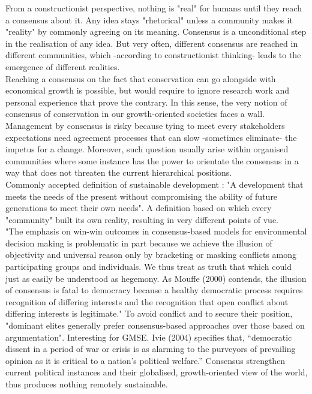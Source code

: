 \documentclass[12pt]{article}
\begin{document}
From a constructionist perspective, nothing is "real" for humans until they reach a consensus about it.
Any idea stays "rhetorical" unless a community makes it "reality" by commonly agreeing on its meaning.
Consensus is a unconditional step in the realisation of any idea.
But very often, different consensus are reached in different communities, which -according to constructionist thinking- leads to the emergence of different realities.\\
Reaching a consensus on the fact that conservation can go alongside with economical growth is possible, but would require to ignore research work and personal experience that prove the contrary. In this sense, the very notion of consensus of conservation in our growth-oriented societies faces a wall.\\
Management by consensus is risky because tying to meet every stakeholders expectations need agreement processes that can slow -sometimes eliminate- the impetus for a change. Moreover, such question usually arise within organised communities where some instance has the power to orientate the consensus in a way that does not threaten the current hierarchical positions.\\
Commonly accepted definition of sustainable development : "A development that meets the needs of the present without compromising the ability of future generations to meet their own needs".
A definition based on which every "community" built its own reality, resulting in very different points of vue.\\
"The emphasis on win-win outcomes in consensus-based models for environmental decision making is problematic in part because we achieve the illusion of objectivity and universal reason only by bracketing or masking conflicts among participating groups and individuals. We thus treat as truth that which could just as easily be understood as hegemony. As Mouffe (2000) contends, the illusion of consensus is fatal to democracy because a healthy democratic process requires recognition of differing interests and the recognition that open conflict about differing interests is legitimate."
To avoid conflict and to secure their position, "dominant elites generally prefer consensus-based approaches over those based on argumentation". Interesting for GMSE.
Ivie (2004) specifies that, “democratic dissent in a period of war or crisis is as alarming to the purveyors of prevailing opinion as it is critical to a nation’s political welfare.”
Consensus strengthen current political instances and their globalised, growth-oriented view of the world, thus produces nothing remotely sustainable.\\
\end{document}
